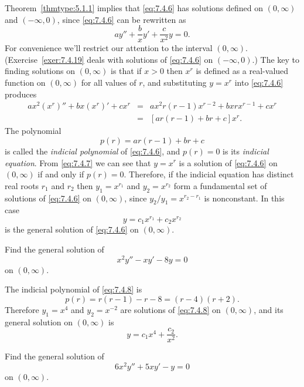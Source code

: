 Theorem~\ref{thmtype:5.1.1} implies that \eqref{eq:7.4.6} has solutions defined on $(0,\infty)$ and
$(-\infty,0)$, since \eqref{eq:7.4.6} can be rewritten as
\[
  ay''+\frac{b}{x}y'+\frac{c}{x^{2}}y=0.
\]
For convenience we'll restrict our attention to the interval $(0,\infty)$.
(Exercise~\ref{exer:7.4.19} deals with solutions of \eqref{eq:7.4.6} on $(-\infty,0)$.) The key to
finding solutions on $(0,\infty)$ is that if $x>0$ then $x^{r}$ is defined as a real-valued function
on $(0,\infty)$ for all values of $r$, and substituting $y=x^{r}$ into \eqref{eq:7.4.6} produces
\begin{equation}
  \label{eq:7.4.7}
  \begin{array}{lcl}
    ax^{2}(x^{r})''+bx(x^{r})'+cx^{r} & = & ax^{2}r(r-1)x^{r-2}+bxrx^{r-1}+cx^{r} \\
                                      & = & [ar(r-1)+br+c]x^{r}.
  \end{array}
\end{equation}
The polynomial
\[
  p(r)=ar(r-1)+br+c
\]
is called the {\color{blue}\it indicial polynomial\/} of \eqref{eq:7.4.6}, and $p(r)=0$ is its
{\color{blue}\it indicial equation\/}. From \eqref{eq:7.4.7} we can see that $y=x^{r}$ is a solution
of \eqref{eq:7.4.6} on $(0,\infty)$ if and only if $p(r)=0$. Therefore, if the indicial equation has
distinct real roots $r_{1}$ and $r_{2}$ then $y_{1}=x^{r_{1}}$ and $y_{2}=x^{r_{2}}$ form a
fundamental set of solutions of \eqref{eq:7.4.6} on $(0,\infty)$, since
$y_{2}/y_{1}=x^{r_{2}-r_{1}}$ is nonconstant. In this case
\[
  y=c_{1}x^{r_{1}}+c_{2}x^{r_{2}}
\]
is the general solution of \eqref{eq:7.4.6} on $(0,\infty)$.

\begin{example}
  \label{example:7.4.4} \rm Find the general solution of
  \begin{equation}
    \label{eq:7.4.8}x^{2}y''-xy'-8y=0
  \end{equation}
  on $(0,\infty)$.
\end{example}

\begin{examplesolution}
\solution The indicial polynomial of \eqref{eq:7.4.8} is
\[
  p(r)=r(r-1)-r-8=(r-4)(r+2).
\]
Therefore $y_{1}=x^{4}$ and $y_{2}=x^{-2}$ are solutions of \eqref{eq:7.4.8} on $(0,\infty)$, and
its general solution on $(0,\infty)$ is
\[
  y=c_{1}x^{4}+\frac{c_{2}}{x^{2}}.
\]
\end{examplesolution}

\begin{example}
  \label{example:7.4.5} \rm Find the general solution of
  \begin{equation}
    \label{eq:7.4.9}6x^{2}y''+5xy'-y=0
  \end{equation}
  on $(0,\infty)$.
\end{example}

